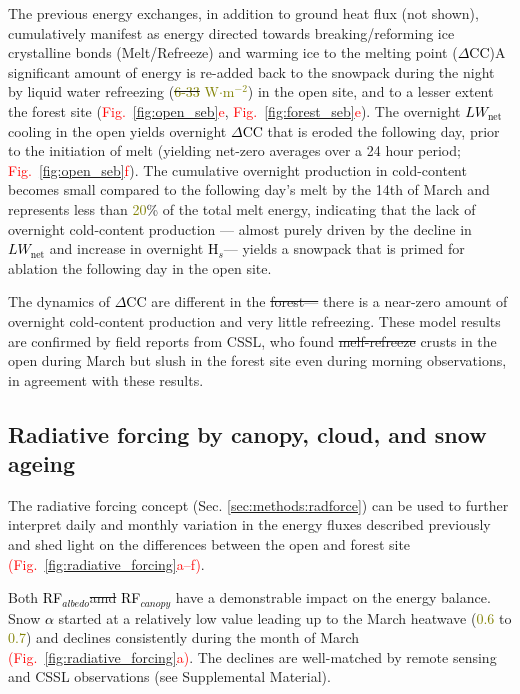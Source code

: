 \documentclass[draft]{agujournal2019}
\newcommand{\fig}[2]{\textcolor{red}{(Fig.~\ref{#1}{#2})}}   %
\newcommand{\fignop}[2]{\textcolor{red}{Fig.~\ref{#1}{#2}}}  %
\newcommand{\mynum}[1]{\textcolor{olive}{#1}}
\newcommand{\lwnet}{\textcolor{black}{$LW_{\mathrm{net}}$}\xspace}
\newcommand{\hs}{\textcolor{black}{H$_s$}\xspace}
\newcommand{\dcc}{\textcolor{black}{$\Delta$CC}\xspace}
\newcommand{\albedo}{\textcolor{black}{$\alpha$}\xspace}
\newcommand{\rfalb}{\textcolor{black}{RF$_{albedo}$}\xspace}
\newcommand{\rfcanopy}{\textcolor{black}{RF$_{canopy}$}\xspace}
\newcommand{\wmsq}{\textcolor{olive}{W$\cdot$m$^{-2}$}\xspace}
\providecommand{\DIFadd}[1]{{\protect\color{blue}\uwave{#1}}} %
\providecommand{\DIFdel}[1]{{\protect\color{red}\sout{#1}}}                      %
\providecommand{\DIFaddbegin}{} %
\providecommand{\DIFaddend}{} %
\providecommand{\DIFdelbegin}{} %
\providecommand{\DIFdelend}{} %
\begin{document}
The previous energy exchanges, in addition to ground heat flux (not shown), cumulatively manifest as energy directed towards breaking/reforming ice crystalline bonds (Melt/Refreeze) and warming ice to the melting point (\dcc)\DIFaddbegin \DIFadd{.
}\DIFaddend A significant amount of energy is re-added back to the snowpack during the night by liquid water refreezing (\DIFdelbegin \DIFdel{\mynum{6-33} }\DIFdelend \DIFaddbegin \DIFadd{\mynum{6--33} }\DIFaddend \wmsq) in the open site, and to a lesser extent the forest site (\fignop{fig:open_seb}{e}, \fignop{fig:forest_seb}{e}).
The overnight \lwnet cooling in the open yields overnight \dcc that is eroded the following day, prior to the initiation of melt (yielding net-zero averages over a 24 hour period; \fignop{fig:open_seb}{f}).
The cumulative overnight production in cold-content becomes small compared to the following day's melt by the 14th of March and represents less than \mynum{20}\% of the total melt energy, indicating that the lack of overnight cold-content production --- almost purely driven by the decline in \lwnet and increase in overnight \hs --- yields a snowpack that is primed for ablation the following day in the open site.

The dynamics of \dcc are different in the \DIFdelbegin \DIFdel{forest--- }\DIFdelend \DIFaddbegin \DIFadd{forest --- }\DIFaddend there is a near-zero amount of overnight cold-content production and very little refreezing.
These model results are confirmed by field reports from CSSL, who found \DIFdelbegin \DIFdel{melf-refreeze }\DIFdelend \DIFaddbegin \DIFadd{melt-refreeze }\DIFaddend crusts in the open during March but slush in the forest site even during morning observations, in agreement with these results.



\subsection{Radiative forcing by canopy, cloud, and snow ageing}
The radiative forcing concept (Sec. \ref{sec:methods:radforce}) can be used to further interpret daily and monthly variation in the energy fluxes described previously and shed light on the differences between the open and forest site \fig{fig:radiative_forcing}{a--f}.

Both \rfalb \DIFdelbegin \DIFdel{amd }\DIFdelend \DIFaddbegin \DIFadd{and }\DIFaddend \rfcanopy have a demonstrable impact on the energy balance.
Snow \albedo started at a relatively low value leading up to the March heatwave (\mynum{0.6} to \mynum{0.7}) and declines consistently during the month of March \fig{fig:radiative_forcing}{a}.
The declines are well-matched by remote sensing and CSSL observations (see Supplemental Material).
\end{document}
